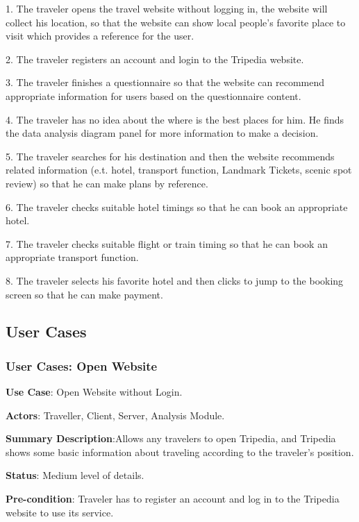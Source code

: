 \documentclass[conference]{IEEEtran}
\begin{document}
1. The traveler opens the travel website without logging in, the website will collect his location, so that the website can show local people's favorite place to visit which provides a reference for the user.

2. The traveler registers an account and login to the Tripedia website.

3. The traveler finishes a questionnaire so that the website can recommend appropriate information for users based on the questionnaire content.

4. The traveler has no idea about the where is the best places for him. He finds the data analysis diagram panel for more information to make a decision.

5. The traveler searches for his destination and then the website recommends related information (e.t. hotel, transport function, Landmark Tickets, scenic spot review) so that he can make plans by reference.

6. The traveler checks suitable hotel timings so that he can book an appropriate hotel.

7. The traveler checks suitable flight or train timing so that he can book an appropriate transport function.

8. The traveler selects his favorite hotel and then clicks to jump to the booking screen so that he can make payment.



\subsection{User Cases}


\subsubsection{User Cases: Open Website}

\textbf{ }

\textbf{Use Case}: Open Website without Login.

\textbf{Actors}: Traveller, Client, Server, Analysis Module.

\textbf{Summary Description}:Allows any travelers to open Tripedia, and Tripedia shows some basic information about traveling according to the traveler's position.
 
\textbf{Status}: Medium level of details.

\textbf{Pre-condition}: Traveler has to register an account and log in to the Tripedia website to use its service.
\end{document}
